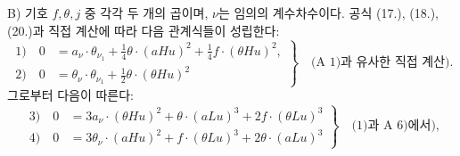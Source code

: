 
B) 기호 $f,\theta,j$ 중 각각 두 개의 곱이며, $\nu$는 임의의 계수차수이다. 공식 (17.), (18.), (20.)과 직접 계산에 따라 다음 관계식들이 성립한다:
\[
\left.
\begin{aligned}
1)\quad 0&=a_\nu\cdot\theta_{\nu_1}+\frac14\theta\cdot(aHu)^2+\frac14f\cdot(\theta Hu)^2,\\
2)\quad 0&=\theta_\nu\cdot\theta_{\nu_1}+\frac12\theta\cdot(\theta Hu)^2
\end{aligned}
\right\}\quad\text{(A 1)과 유사한 직접 계산).}
\]
그로부터 다음이 따른다:
\[
\left.
\begin{aligned}
3)\quad 0&=3a_\nu\cdot(\theta Hu)^2+\theta\cdot(aLu)^3+2f\cdot(\theta Lu)^3\\
4)\quad 0&=3\theta_\nu\cdot(aHu)^2+f\cdot(\theta Lu)^3+2\theta\cdot(aLu)^3
\end{aligned}
\right\}\quad\text{(1)과 A 6)에서),}
\]
